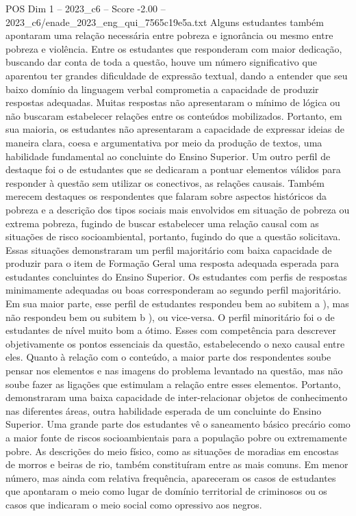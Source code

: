 \begin{textsample}{POS Dim 1 – 2023\_c6 – Score -2.00 – 2023\_c6/enade\_2023\_eng\_qui\_7565c19e5a.txt}
Alguns estudantes também apontaram uma relação necessária entre pobreza e ignorância ou mesmo entre pobreza e violência.
Entre os estudantes que responderam com maior dedicação, buscando dar conta de toda a questão, houve um número significativo que aparentou ter grandes dificuldade de expressão textual, dando a entender que seu baixo domínio da linguagem verbal comprometia a capacidade de produzir respostas adequadas.
Muitas respostas não apresentaram o mínimo de lógica ou não buscaram estabelecer relações entre os conteúdos mobilizados.
Portanto, em sua maioria, os estudantes não apresentaram a capacidade de expressar ideias de maneira clara, coesa e argumentativa por meio da produção de textos, uma habilidade fundamental ao concluinte do Ensino Superior.
Um outro perfil de destaque foi o de estudantes que se dedicaram a pontuar elementos válidos para responder à questão sem utilizar os conectivos, as relações causais.
Também merecem destaques os respondentes que falaram sobre aspectos históricos da pobreza e a descrição dos tipos sociais mais envolvidos em situação de pobreza ou extrema pobreza, fugindo de buscar estabelecer uma relação causal com as situações de risco socioambiental, portanto, fugindo do que a questão solicitava.
Essas situações demonstraram um perfil majoritário com baixa capacidade de produzir para o item de Formação Geral uma resposta adequada esperada para estudantes concluintes do Ensino Superior.
Os estudantes com perfis de respostas minimamente adequadas ou boas corresponderam ao segundo perfil majoritário.
Em sua maior parte, esse perfil de estudantes respondeu bem ao subitem a ), mas não respondeu bem ou subitem b ), ou vice-versa.
O perfil minoritário foi o de estudantes de nível muito bom a ótimo.
Esses com competência para descrever objetivamente os pontos essenciais da questão, estabelecendo o nexo causal entre eles.
Quanto à relação com o conteúdo, a maior parte dos respondentes soube pensar nos elementos e nas imagens do problema levantado na questão, mas não soube fazer as ligações que estimulam a relação entre esses elementos.
Portanto, demonstraram uma baixa capacidade de inter-relacionar objetos de conhecimento nas diferentes áreas, outra habilidade esperada de um concluinte do Ensino Superior.
Uma grande parte dos estudantes vê o saneamento básico precário como a maior fonte de riscos socioambientais para a população pobre ou extremamente pobre.
As descrições do meio físico, como as situações de moradias em encostas de morros e beiras de rio, também constituíram entre as mais comuns.
Em menor número, mas ainda com relativa frequência, apareceram os casos de estudantes que apontaram o meio como lugar de domínio territorial de criminosos ou os casos que indicaram o meio social como opressivo aos negros.

\end{textsample}
